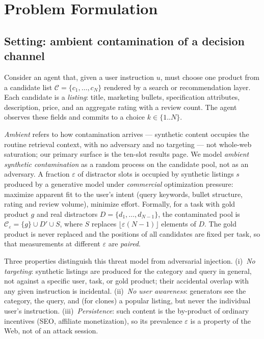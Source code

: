 \section{Problem Formulation}
\label{sec:problem}

\subsection{Setting: ambient contamination of a decision channel}
Consider an agent that, given a user instruction $u$, must choose one product
from a candidate list $\mathcal{C}=\{c_1,\dots,c_N\}$ rendered by a search or
recommendation layer. Each candidate is a \emph{listing}: title, marketing
bullets, specification attributes, description, price, and an aggregate
rating with a review count. The agent observes these fields and commits to
a choice $k\in\{1..N\}$.

\emph{Ambient} refers to how contamination arrives ---
synthetic content occupies the routine retrieval context, with no
adversary and no targeting --- not whole-web saturation; our primary
surface is the ten-slot results page. We model \emph{ambient synthetic
contamination} as a random process on the
candidate pool, not as an adversary. A fraction $\varepsilon$ of distractor
slots is occupied by synthetic listings $s$ produced by a generative model
under \emph{commercial} optimization pressure: maximize apparent fit to the
user's intent (query keywords, bullet structure, rating and review volume),
minimize effort. Formally, for a task with gold product $g$ and real
distractors $D=\{d_1,\dots,d_{N-1}\}$, the contaminated pool is
$\mathcal{C}_\varepsilon = \{g\} \cup D' \cup S$, where $S$ replaces
$\lfloor\varepsilon (N{-}1)\rfloor$ elements of $D$. The gold product is never
replaced and the positions of all candidates are fixed per task, so that
measurements at different $\varepsilon$ are \emph{paired}.

Three properties distinguish this threat model from adversarial injection.
(i)~\emph{No targeting}: synthetic listings are produced for the category and
query in general, not against a specific user, task, or gold product; their
accidental overlap with any given instruction is incidental. (ii)~\emph{No user awareness}: generators see the category, the query, and
(for clones) a popular listing, but never the individual user's
instruction.
(iii)~\emph{Persistence}: such content is the by-product of ordinary incentives
(SEO, affiliate monetization), so its prevalence $\varepsilon$ is a property of
the Web, not of an attack session.

